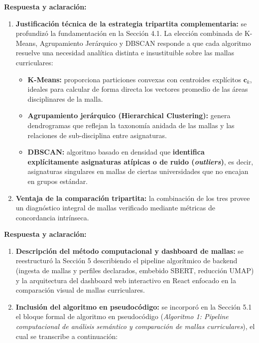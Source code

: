 \vspace{0.2cm}

\noindent
\textbf{Respuesta y aclaración:}
\begin{enumerate}[leftmargin=*]
	\item \textbf{Justificación técnica de la estrategia tripartita complementaria:} se profundizó la fundamentación en la Sección 4.1. La elección combinada de K-Means, Agrupamiento Jerárquico y DBSCAN responde a que cada algoritmo resuelve una necesidad analítica distinta e insustituible sobre las mallas curriculares:
	      \begin{itemize}
		      \item \textbf{K-Means:} proporciona particiones convexas con centroides explícitos $\mathbf{c}_k$, ideales para calcular de forma directa los vectores promedio de las áreas disciplinares de la malla.
		      \item \textbf{Agrupamiento jerárquico (Hierarchical Clustering):} genera dendrogramas que reflejan la taxonomía anidada de las mallas y las relaciones de sub-disciplina entre asignaturas.
		      \item \textbf{DBSCAN:} algoritmo basado en densidad que \textbf{identifica explícitamente asignaturas atípicas o de ruido (\textit{outliers})}, es decir, asignaturas singulares en mallas de ciertas universidades que no encajan en grupos estándar.
	      \end{itemize}
	\item \textbf{Ventaja de la comparación tripartita:} la combinación de los tres provee un diagnóstico integral de mallas verificado mediante métricas de concordancia intrínseca.
\end{enumerate}

\newpage

\noindent
{}

\vspace{0.2cm}

\noindent
\textbf{Respuesta y aclaración:}
\begin{enumerate}[leftmargin=*]
	\item \textbf{Descripción del método computacional y dashboard de mallas:} se reestructuró la Sección 5 describiendo el pipeline algorítmico de backend (ingesta de mallas y perfiles declarados, embebido SBERT, reducción UMAP) y la arquitectura del dashboard web interactivo en React enfocado en la comparación visual de mallas curriculares.
	\item \textbf{Inclusión del algoritmo en pseudocódigo:} se incorporó en la Sección 5.1 el bloque formal de algoritmo en pseudocódigo (\textit{Algoritmo 1: Pipeline computacional de análisis semántico y comparación de mallas curriculares}), el cual se transcribe a continuación:
\end{enumerate}

